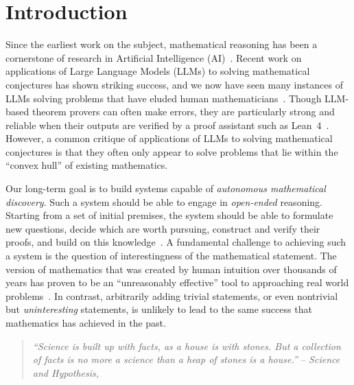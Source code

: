 
\section{Introduction}
\label{sec:intro}


Since the earliest work on the subject, mathematical reasoning has been a cornerstone of research in Artificial Intelligence (AI)~\citep{turing1939ordinal,newell1956logic}.
%
Recent work on applications of Large Language Models (LLMs) to solving mathematical conjectures has shown striking success, and we now have seen many instances of LLMs solving problems that have eluded human mathematicians~\citep{novikov2025alphaevolve,sothanaphan2026erdos728,alexeev2026shortproofs,alexeev2026shortproofsii,alon2026unitdistance,chen2026moonshine,oum2026cycledoublecover,huang2026sumproduct, openai2026navierstokes}.
%
Though LLM-based theorem provers can often make errors, they are particularly strong and reliable when their outputs are verified by a proof assistant such as Lean~4~\citep{moura2021lean4,mathlib2020,yang2023leandojo,xin2024deepseekprover,hubert2024alphaproof,ren2025deepseekproverv2}.
%
However, a common critique of applications of LLMs to solving mathematical conjectures is that they often only appear to solve problems that lie within the ``convex hull'' of existing mathematics.


Our long-term goal is to build systems capable of \emph{autonomous mathematical discovery}.
%
Such a system should be able to engage in \emph{open-ended} reasoning. Starting from a set of initial premises, the system should be able to formulate new questions, decide which are worth pursuing, construct and verify their proofs, and build on this knowledge~\citep{barkeshli2026structure}.
%
A fundamental challenge to achieving such a system is the question of interestingness of the mathematical statement.
%
The version of mathematics that was created by human intuition over thousands of years has proven to be an ``unreasonably effective'' tool to approaching real world problems~\citep{wigner1960unreasonable}. In contrast, arbitrarily adding trivial statements, or even nontrivial but \emph{uninteresting} statements, is unlikely to lead to the same success that mathematics has achieved in the past.



{
\begin{quote}
    { \emph{``Science is built up with facts, as a house is with stones. But a collection of facts is no more a science than a heap of stones is a house.''}} -- \emph{Science and Hypothesis,} \cite{poincare1905science}
\end{quote}
}


